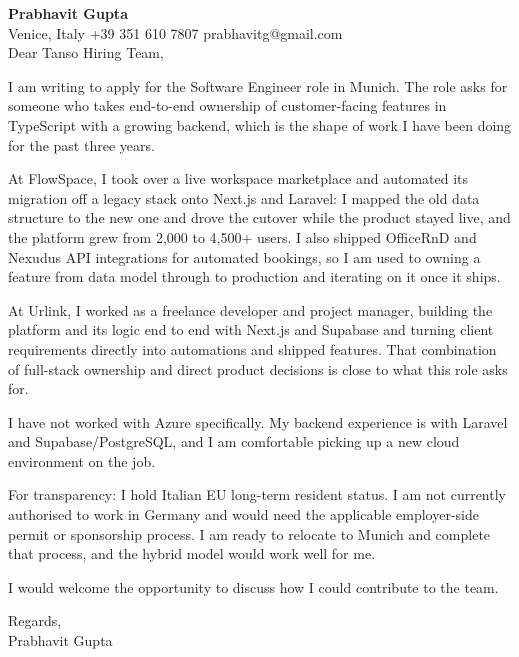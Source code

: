 \documentclass[a4paper,10.5pt]{article}
\begin{document}
\textbf{Prabhavit Gupta}\\
Venice, Italy \textbar{} +39 351 610 7807 \textbar{} prabhavitg@gmail.com\\[10pt]
Dear Tanso Hiring Team,

I am writing to apply for the Software Engineer role in Munich. The role asks for someone who takes end-to-end ownership of customer-facing features in TypeScript with a growing backend, which is the shape of work I have been doing for the past three years.

At FlowSpace, I took over a live workspace marketplace and automated its migration off a legacy stack onto Next.js and Laravel: I mapped the old data structure to the new one and drove the cutover while the product stayed live, and the platform grew from 2,000 to 4,500+ users. I also shipped OfficeRnD and Nexudus API integrations for automated bookings, so I am used to owning a feature from data model through to production and iterating on it once it ships.

At Urlink, I worked as a freelance developer and project manager, building the platform and its logic end to end with Next.js and Supabase and turning client requirements directly into automations and shipped features. That combination of full-stack ownership and direct product decisions is close to what this role asks for.

I have not worked with Azure specifically. My backend experience is with Laravel and Supabase/PostgreSQL, and I am comfortable picking up a new cloud environment on the job.

For transparency: I hold Italian EU long-term resident status. I am not currently authorised to work in Germany and would need the applicable employer-side permit or sponsorship process. I am ready to relocate to Munich and complete that process, and the hybrid model would work well for me.

I would welcome the opportunity to discuss how I could contribute to the team.

Regards,\\
Prabhavit Gupta
\end{document}
